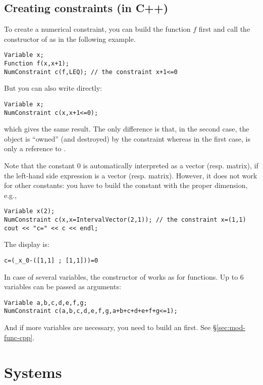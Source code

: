 \subsection{Creating constraints (in C++)}\label{sec:mod-ctr-cpp}

To create a numerical constraint, you can build the function $f$ first and
call the constructor of  as in the following example.

\begin{lstlisting}
Variable x;
Function f(x,x+1);
NumConstraint c(f,LEQ); // the constraint x+1<=0
\end{lstlisting}	

But you can also write directly:
\begin{lstlisting}
Variable x;
NumConstraint c(x,x+1<=0);
\end{lstlisting}	
which gives the same result. The only difference is that, in the second case,
the object  is ``owned'' (and destroyed) by the constraint whereas 
in the first case,  is only a reference to .

Note that the constant $0$ is automatically interpreted as a vector (resp. matrix),
if the left-hand side expression is a vector (resp. matrix). However, it does not
work for other constants: you have to build the constant with the proper dimension,
e.g.,
\begin{lstlisting}
Variable x(2);
NumConstraint c(x,x=IntervalVector(2,1)); // the constraint x=(1,1)
cout << "c=" << c << endl;
\end{lstlisting}	

The display is:
\begin{verbatim}
c=(_x_0-([1,1] ; [1,1]))=0
\end{verbatim}

In case of several variables, the constructor of  works as for functions.
Up to 6 variables can be passed as arguments:
\begin{lstlisting}
Variable a,b,c,d,e,f,g;
NumConstraint c(a,b,c,d,e,f,g,a+b+c+d+e+f+g<=1);
\end{lstlisting}	

And if more variables are necessary, you need to build an  first.
See \S\ref{sec:mod-func-cpp}.

\section{Systems}

